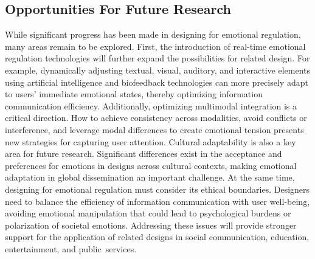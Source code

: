 \subsection{Opportunities For Future Research}
While significant progress has been made in designing for emotional regulation, many areas remain to be explored. First, the introduction of real-time emotional regulation technologies will further expand the possibilities for related design. For example, dynamically adjusting textual, visual, auditory, and interactive elements using artificial intelligence and biofeedback technologies can more precisely adapt to users’ immediate emotional states, thereby optimizing information communication efficiency. Additionally, optimizing multimodal integration is a critical direction. How to achieve consistency across modalities, avoid conflicts or interference, and leverage modal differences to create emotional tension presents new strategies for capturing user attention. Cultural adaptability is also a key area for future research. Significant differences exist in the acceptance and preferences for emotions in designs across cultural contexts, making emotional adaptation in global dissemination an important challenge. At the same time, designing for emotional regulation must consider its ethical boundaries. Designers need to balance the efficiency of information communication with user well-being, avoiding emotional manipulation that could lead to psychological burdens or polarization of societal emotions. Addressing these issues will provide stronger support for the application of related designs in social communication, education, entertainment, and public~services.
